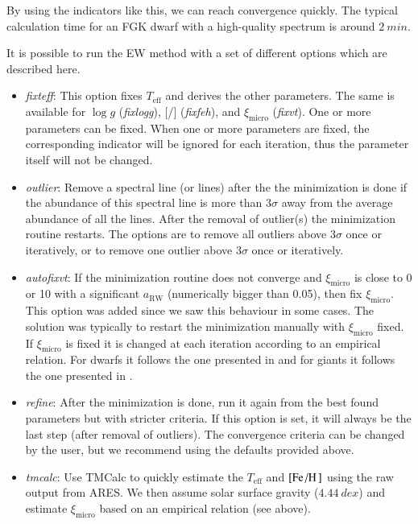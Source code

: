 \documentclass{aa}
\begin{document}
By using the indicators like this, we can reach convergence quickly. The typical
calculation time for an FGK dwarf with a high-quality spectrum is around
$\SI{2}{min}$.

It is possible to run the EW method with a set of different options which are
described here.
\begin{itemize}
    \item \emph{fixteff}: This option fixes $T_\mathrm{eff}$ and derives the
          other parameters. The same is available for $\log g$ (\emph{fixlogg}),
          [/] (\emph{fixfeh}), and $\xi_\mathrm{micro}$
          (\emph{fixvt}). One or more parameters can be fixed. When one or more
          parameters are fixed, the corresponding indicator will be ignored for
          each iteration, thus the parameter itself will not be changed.
    \item \emph{outlier}: Remove a spectral line (or lines) after the the
          minimization is done if the abundance of this spectral line is more
          than $3\sigma$ away from the average abundance of all the lines. After
          the removal of outlier(s) the minimization routine restarts. The
          options are to remove all outliers above $3\sigma$ once or
          iteratively, or to remove one outlier above $3\sigma$ once or iteratively.
    \item \emph{autofixvt}: If the minimization routine does not converge and
          $\xi_\mathrm{micro}$ is close to 0 or 10 with a significant
          $a_\mathrm{RW}$ (numerically bigger than 0.05), then fix
          $\xi_\mathrm{micro}$. This option was added since we saw this
          behaviour in some cases. The solution was typically to restart the
          minimization manually with $\xi_\mathrm{micro}$ fixed. If
          $\xi_\mathrm{micro}$ is fixed it is changed at each iteration
          according to an empirical relation. For dwarfs it follows the one
          presented in \citet{Tsantaki2013} and for giants it follows the one
          presented in \citet{Adibekyan2015}.
    \item \emph{refine}: After the minimization is done, run it again from the best
          found parameters but with stricter criteria. If this option is set,
          it will always be the last step (after removal of outliers). The
          convergence criteria can be changed by the user, but we recommend
          using the defaults provided above.
    \item \emph{tmcalc}: Use TMCalc \citep{Sousa2012} to quickly estimate the
          $T_\mathrm{eff}$ and $[\ion{Fe}/\ion{H}]$ using the raw output from
          ARES. We then assume solar surface gravity ($\SI{4.44}{dex}$) and
          estimate $\xi_\mathrm{micro}$ based on an empirical relation (see above).
\end{itemize}
\end{document}
